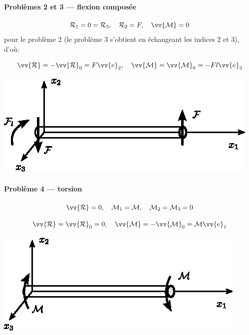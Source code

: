 \paragraph{Problèmes 2 et 3 --- flexion composée}
\begin{equation}
    \mathcal{R}_1 = 0 = \mathcal{R}_3, \quad \mathcal{R}_2 = F, \quad \vv{\mathcal{M}} = 0
    \label{eq:Ch07-010}
\end{equation}
pour le problème 2 (le problème 3 s'obtient en échangeant les indices 2 et 3), d'où:
\begin{multicols}{2}
    \begin{equation*}
        \vv{\mathcal{R}} = -\vv{\mathcal{R}}_0 = F \vv{e}_2, \quad \vv{\mathcal{M}} = \vv{\mathcal{M}}_0 = -F l \vv{e}_3
    \end{equation*}
    \columnbreak
    \begin{center}
        \includegraphics{../images/T1_Ch07-03}
    \end{center}
\end{multicols}
\paragraph{Problème 4 --- torsion}
\begin{equation}
    \vv{\mathcal{R}} = 0 , \quad \mathcal{M}_1 = \mathcal{M}, \quad \mathcal{M}_2 = \mathcal{M}_3 = 0
    \label{eq:Ch07-011}
\end{equation}
\begin{multicols}{2}
    \begin{equation*}
        \vv{\mathcal{R}} = \vv{\mathcal{R}}_0 = 0, \quad \vv{\mathcal{M}} = -\vv{\mathcal{M}}_0 = \mathcal{M} \vv{e}_1
    \end{equation*}
    \columnbreak
    \begin{center}
        \includegraphics{../images/T1_Ch07-04}
    \end{center}
\end{multicols}
